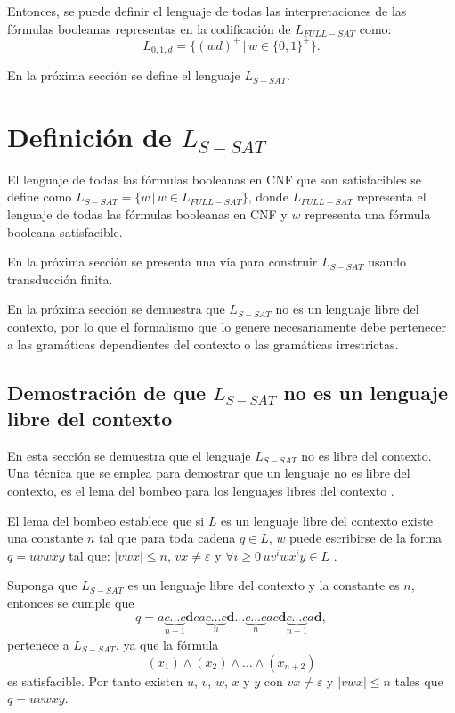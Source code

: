 Entonces, se puede definir el lenguaje de todas las interpretaciones de las fórmulas booleanas representas en la codificación
de $L_{FULL-SAT}$ como:
$$L_{0,1,d}=\{(wd)^+\,|\,w\in\{0,1\}^+\}.$$

En la próxima sección se define el lenguaje $L_{S-SAT}$.

\section{Definición de $L_{S-SAT}$}

El lenguaje de todas las fórmulas booleanas en CNF que son satisfacibles se define como $L_{S-SAT}=\{w\,|\,w \in L_{FULL-SAT} \}$,
donde $L_{FULL-SAT}$ representa el lenguaje de todas las fórmulas booleanas en CNF y $w$ representa una fórmula booleana satisfacible.

En la próxima sección se presenta una vía para construir $L_{S-SAT}$ usando transducción finita.

En la próxima sección se demuestra que $L_{S-SAT}$ no es un lenguaje libre del contexto, por lo que el formalismo que lo
genere necesariamente debe pertenecer a las gramáticas dependientes del contexto o las gramáticas irrestrictas.

\subsection{Demostración de que $L_{S-SAT}$ no es un lenguaje libre del contexto}

En esta sección se demuestra que el lenguaje $L_{S-SAT}$ no es libre del contexto. Una técnica que se emplea para demostrar que un lenguaje no es libre del contexto, es el lema del bombeo para los lenguajes
libres del contexto \cite{authomataTheory}.

El lema del bombeo establece que si $L$ es un lenguaje libre del contexto
existe una constante $n$ tal que para toda cadena $q\in L$, $w$ puede escribirse de la forma $q=uvwxy$ tal que:
$|vwx|\leq n$, $vx\neq \varepsilon$ y $\forall i\geq 0\,uv^iwx^iy\in L$ \cite{authomataTheory}.

Suponga que $L_{S-SAT}$ es un lenguaje libre del contexto y la constante es $n$, entonces se cumple que
$$q=a\underbrace{c\ldots c}_{n+1}\mathbf{d}ca\underbrace{c\ldots c}_{n}\mathbf{d}\ldots \underbrace{c\ldots c}_{n}ac\mathbf{d}\underbrace{c\ldots c}_{n+1}a\mathbf{d},$$
pertenece a $L_{S-SAT}$, ya que la fórmula
$$(x_1)\wedge(x_2)\wedge\ldots\wedge(x_{n+2})$$ es satisfacible. Por tanto existen $u$, $v$, $w$, $x$ y $y$ con $vx\neq \varepsilon$ y $|vwx|\leq n$
tales que $q=uvwxy$.

